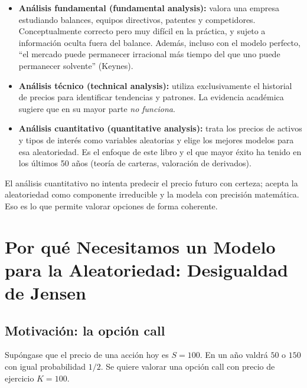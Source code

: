 \documentclass[12pt]{article}
\begin{document}
\begin{itemize}
  \item \textbf{An\'alisis fundamental (fundamental analysis):} valora una empresa
        estudiando balances, equipos directivos, patentes y competidores.
        Conceptualmente correcto pero muy dif\'icil en la pr\'actica, y sujeto a
        informaci\'on oculta fuera del balance. Adem\'as, incluso con el modelo
        perfecto, ``el mercado puede permanecer irracional m\'as tiempo del que
        uno puede permanecer solvente'' (Keynes).

  \item \textbf{An\'alisis t\'ecnico (technical analysis):} utiliza exclusivamente
        el historial de precios para identificar tendencias y patrones.
        La evidencia acad\'emica sugiere que en su mayor parte \emph{no funciona}.

  \item \textbf{An\'alisis cuantitativo (quantitative analysis):} trata los precios
        de activos y tipos de inter\'es como variables aleatorias y elige los mejores
        modelos para esa aleatoriedad. Es el enfoque de este libro y el que mayor
        \'exito ha tenido en los \'ultimos 50 a\~nos (teor\'ia de carteras, valoraci\'on
        de derivados).
\end{itemize}

\begin{intuicion}
El an\'alisis cuantitativo no intenta predecir el precio futuro con certeza; acepta
la aleatoriedad como componente irreducible y la modela con precisi\'on matem\'atica.
Eso es lo que permite valorar opciones de forma coherente.
\end{intuicion}

\section{Por qu\'e Necesitamos un Modelo para la Aleatoriedad: Desigualdad de Jensen}

\subsection{Motivaci\'on: la opci\'on call}

Sup\'ongase que el precio de una acci\'on hoy es $S = 100$. En un a\~no valdr\'a
$50$ o $150$ con igual probabilidad $1/2$.
Se quiere valorar una opci\'on call con precio de ejercicio $K = 100$.
\end{document}
